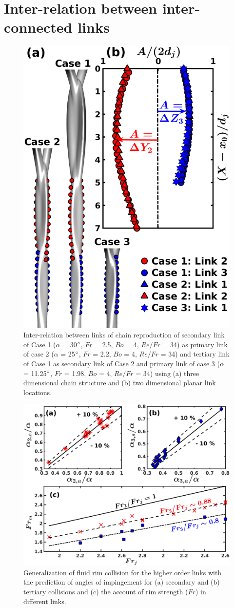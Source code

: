 \documentclass[%
 aip,
 sd,%
amsmath,amssymb,
preprint,%
author-year,%
]{revtex4-1}
\begin{document}
\section{Inter-relation between inter-connected links} 
\begin{figure}
	\centering
	\includegraphics[width=0.5\linewidth]{Figure11}
	\caption{Inter-relation between links of chain reproduction of secondary link of Case 1 ($\alpha$ = 30$\degree$, $Fr$ = 2.5, $Bo$ = 4, $Re/Fr$ = 34) as primary link of case 2 ($\alpha$ = 25$\degree$, $Fr$ = 2.2, $Bo$ = 4, $Re/Fr$ = 34) and tertiary link of Case 1 as secondary link of Case 2 and primary link of case 3 ($\alpha$ = 11.25$\degree$, $Fr$ = 1.98, $Bo$ = 4, $Re/Fr$ = 34) using (a) three dimensional chain structure and (b) two dimensional planar link locations.}
	\label{Figure::secondCollision}
\end{figure}
\begin{figure}
	\centering
	\includegraphics[width=\linewidth]{Figure12}
	\caption{Generalization of fluid rim collision for the higher order links with the prediction of angles of impingement for (a) secondary and (b) tertiary collisions and (c) the account of rim strength ($Fr$) in different links.}
	\label{Figure::secondGraph}
\end{figure}
\end{document}
